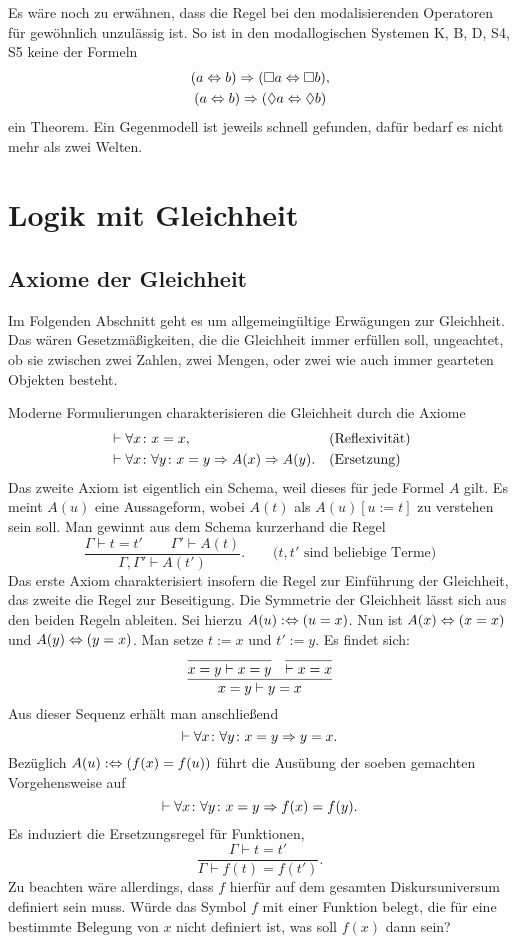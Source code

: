 \noindent
Es wäre noch zu erwähnen, dass die Regel bei den modalisierenden
Operatoren für gewöhnlich unzulässig ist. So ist in den modallogischen
Systemen K, B, D, S4, S5 keine der Formeln
\begin{gather*}
(a\Leftrightarrow b)\Rightarrow (\Box a\Leftrightarrow\Box b),\\
(a\Leftrightarrow b)\Rightarrow (\Diamond a\Leftrightarrow\Diamond b)
\end{gather*}
ein Theorem. Ein Gegenmodell ist jeweils schnell gefunden, dafür
bedarf es nicht mehr als zwei Welten.

\newpage
\section{Logik mit Gleichheit}

\subsection{Axiome der Gleichheit}

Im Folgenden Abschnitt geht es um allgemeingültige Erwägungen zur
Gleichheit. Das wären Gesetzmäßigkeiten, die die Gleichheit immer
erfüllen soll, ungeachtet, ob sie zwischen zwei Zahlen, zwei Mengen,
oder zwei wie auch immer gearteten Objekten besteht.

Moderne Formulierungen charakterisieren die Gleichheit durch die Axiome
\begin{align*}
&\vdash\forall x\colon x=x, &&\text{(Reflexivität)}\\
&\vdash\forall x\colon\forall y\colon x=y\Rightarrow A(x)\Rightarrow A(y).
&&\text{(Ersetzung)}
\end{align*}
Das zweite Axiom ist eigentlich ein Schema, weil dieses für jede
Formel $A$ gilt. Es meint $A(u)$ eine Aussageform, wobei $A(t)$ als
$A(u)[u:=t]$ zu verstehen sein soll. Man gewinnt aus dem Schema
kurzerhand die Regel
\[\dfrac{\Gamma\vdash t=t'\qquad\Gamma'\vdash A(t)}
{\Gamma,\Gamma'\vdash A(t')}.\qquad\text{($t,t'$ sind beliebige Terme)}\]
Das erste Axiom charakterisiert insofern die Regel zur Einführung
der Gleichheit, das zweite die Regel zur Beseitigung. Die Symmetrie
der Gleichheit lässt sich aus den beiden Regeln ableiten. Sei hierzu
$A(u):\Leftrightarrow (u=x)$. Nun ist $A(x)\Leftrightarrow (x=x)$ und
$A(y)\Leftrightarrow (y=x)$. Man setze $t:=x$ und $t':=y$. Es findet sich:
\[
\infer{x=y\vdash y=x}{
  \infer{x=y\vdash x=y}{}
& \infer{\vdash x=x}{}}
\]
Aus dieser Sequenz erhält man anschließend
\[\vdash\forall x\colon\forall y\colon x=y\Rightarrow y=x.\]
Bezüglich $A(u):\Leftrightarrow (f(x)=f(u))$ führt die Ausübung der soeben
gemachten Vorgehensweise auf
\[\vdash\forall x\colon\forall y\colon x=y\Rightarrow f(x)=f(y).\]
Es induziert die Ersetzungsregel für Funktionen,
\[\dfrac{\Gamma\vdash t=t'}{\Gamma\vdash f(t)=f(t')}.\]
Zu beachten wäre allerdings, dass $f$ hierfür auf dem gesamten
Diskursuniversum definiert sein muss. Würde das Symbol $f$ mit einer
Funktion belegt, die für eine bestimmte Belegung von $x$ nicht definiert
ist, was soll $f(x)$ dann sein?

